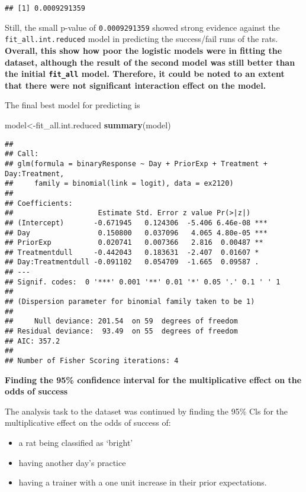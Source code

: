 \documentclass[
]{article}
\newenvironment{Shaded}{\begin{snugshade}}{\end{snugshade}}
\newcommand{\FunctionTok}[1]{\textcolor[rgb]{0.13,0.29,0.53}{\textbf{#1}}}
\newcommand{\NormalTok}[1]{#1}
\newcommand{\OtherTok}[1]{\textcolor[rgb]{0.56,0.35,0.01}{#1}}
\providecommand{\tightlist}{%
  \setlength{\itemsep}{0pt}\setlength{\parskip}{0pt}}
\begin{document}
\begin{verbatim}
## [1] 0.0009291359
\end{verbatim}

Still, the small p-value of \texttt{0.0009291359} showed strong evidence
against the \texttt{fit\_all.int.reduced} model in predicting the
success/fail runs of the rats. \textbf{Overall, this show how poor the
logistic models were in fitting the dataset, although the result of the
second model was still better than the initial \texttt{fit\_all} model.
Therefore, it could be noted to an extent that there were not
significant interaction effect on the model.}

The final best model for predicting is

\begin{Shaded}
\begin{Highlighting}[]
\NormalTok{model}\OtherTok{\textless{}{-}}\NormalTok{fit\_all.int.reduced}
\FunctionTok{summary}\NormalTok{(model)}
\end{Highlighting}
\end{Shaded}

\begin{verbatim}
## 
## Call:
## glm(formula = binaryResponse ~ Day + PriorExp + Treatment + Day:Treatment, 
##     family = binomial(link = logit), data = ex2120)
## 
## Coefficients:
##                    Estimate Std. Error z value Pr(>|z|)    
## (Intercept)       -0.671945   0.124306  -5.406 6.46e-08 ***
## Day                0.150800   0.037096   4.065 4.80e-05 ***
## PriorExp           0.020741   0.007366   2.816  0.00487 ** 
## Treatmentdull     -0.442043   0.183631  -2.407  0.01607 *  
## Day:Treatmentdull -0.091102   0.054709  -1.665  0.09587 .  
## ---
## Signif. codes:  0 '***' 0.001 '**' 0.01 '*' 0.05 '.' 0.1 ' ' 1
## 
## (Dispersion parameter for binomial family taken to be 1)
## 
##     Null deviance: 201.54  on 59  degrees of freedom
## Residual deviance:  93.49  on 55  degrees of freedom
## AIC: 357.2
## 
## Number of Fisher Scoring iterations: 4
\end{verbatim}

\textbf{Finding the 95\% confidence interval for the multiplicative
effect on the odds of success}

The analysis task to the dataset was continued by finding the 95\% Cls
for the multiplicative effect on the odds of success of:

\begin{itemize}
\tightlist
\item
  a rat being classified as `bright'
\item
  having another day's practice
\item
  having a trainer with a one unit increase in their prior expectations.
\end{itemize}
\end{document}
